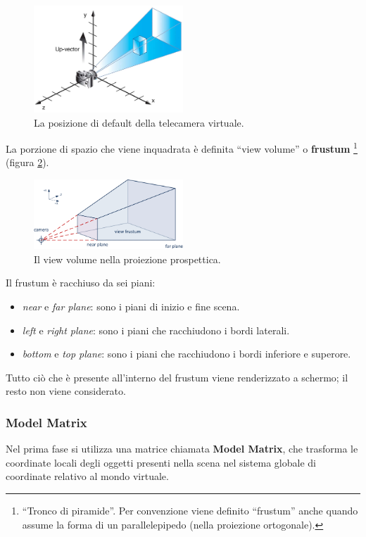 \begin{figure}[htbp]
\centering
\includegraphics[width=0.5\textwidth]{images/frustum/camera-default.jpg}
\caption{La posizione di default della telecamera virtuale.\label{cam-default}}
\end{figure}

La porzione di spazio che viene inquadrata è definita “view volume” o \textbf{frustum} \footnote{“Tronco di piramide”. Per convenzione viene definito “frustum” anche quando assume la forma di un parallelepipedo (nella proiezione ortogonale).} (figura \ref{view-frustum}). 
\begin{figure}[htbp]
\centering
\includegraphics[width=0.5\textwidth]{images/frustum/view_frustum.png}
\caption{Il view volume nella proiezione prospettica.\label{view-frustum}}
\end{figure}
Il frustum è racchiuso da sei piani:
\begin{itemize}
\item \textit{near} e \textit{far plane}: sono i piani di inizio e fine scena.
\item \textit{left} e \textit{right plane}: sono i piani che racchiudono i bordi laterali.
\item \textit{bottom} e \textit{top plane}: sono i piani che racchiudono i bordi inferiore e superore.
\end{itemize}

Tutto ciò che è presente all'interno del frustum viene renderizzato a schermo; il resto non viene considerato.

\subsubsection{Model Matrix}
Nel prima fase si utilizza una matrice chiamata \textbf{Model Matrix}, che trasforma le coordinate locali degli oggetti presenti nella scena nel sistema globale di coordinate relativo al mondo virtuale. 

